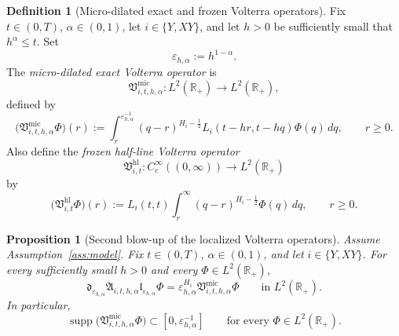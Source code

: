 \documentclass[11pt,a4paper]{amsart}
\theoremstyle{plain}
\newtheorem{proposition}[theorem]{Proposition}
\theoremstyle{definition}
\newtheorem{definition}[theorem]{Definition}
\theoremstyle{remark}
\newcommand{\R}{\mathbb{R}}
\begin{document}
\begin{definition}[Micro-dilated exact and frozen Volterra operators]
\label{def:micro-volterra}
Fix \(t\in(0,T)\), \(\alpha\in(0,1)\), let \(i\in\{Y,XY\}\), and let \(h>0\) be sufficiently small
that \(h^\alpha\le t\). Set
\[
\varepsilon_{h,\alpha}:=h^{1-\alpha}.
\]
The \emph{micro-dilated exact Volterra operator} is
\[
\mathfrak V_{i,t,h,\alpha}^{\mathrm{mic}}:L^2(\R_+)\to L^2(\R_+),
\]
defined by
\begin{equation}\label{eq:micro-volterra}
\bigl(\mathfrak V_{i,t,h,\alpha}^{\mathrm{mic}}\Phi\bigr)(r)
:=
\int_r^{\varepsilon_{h,\alpha}^{-1}}
(q-r)^{H_i-\frac12}
L_i(t-hr,t-hq)\Phi(q)\,dq,
\qquad r\ge0.
\end{equation}
Also define the \emph{frozen half-line Volterra operator}
\[
\mathfrak V_{i,t}^{\mathrm{hl}}:C_c^\infty((0,\infty))\to L^2(\R_+)
\]
by
\begin{equation}\label{eq:halfline-volterra}
\bigl(\mathfrak V_{i,t}^{\mathrm{hl}}\Phi\bigr)(r)
:=
L_i(t,t)\int_r^\infty (q-r)^{H_i-\frac12}\Phi(q)\,dq,
\qquad r\ge0.
\end{equation}
\end{definition}

\begin{proposition}[Second blow-up of the localized Volterra operators]
\label{prop:micro-volterra}
Assume Assumption~\ref{ass:model}. Fix \(t\in(0,T)\), \(\alpha\in(0,1)\), and let
\(i\in\{Y,XY\}\). For every sufficiently small \(h>0\) and every \(\Phi\in L^2(\R_+)\),
\begin{equation}\label{eq:micro-volterra-exact}
\mathfrak d_{\varepsilon_{h,\alpha}}
\mathfrak A_{i,t,h,\alpha}
\mathfrak l_{\varepsilon_{h,\alpha}}\Phi
=
\varepsilon_{h,\alpha}^{H_i}
\mathfrak V_{i,t,h,\alpha}^{\mathrm{mic}}\Phi
\qquad\text{in }L^2(\R_+).
\end{equation}
In particular,
\begin{equation}\label{eq:micro-volterra-support}
\operatorname{supp}\bigl(\mathfrak V_{i,t,h,\alpha}^{\mathrm{mic}}\Phi\bigr)
\subset
[0,\varepsilon_{h,\alpha}^{-1}]
\qquad\text{for every }\Phi\in L^2(\R_+).
\end{equation}
\end{proposition}
\end{document}
